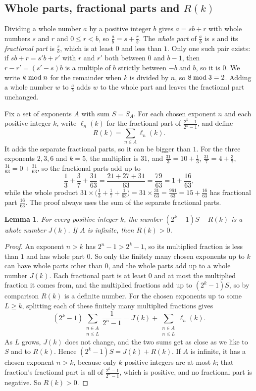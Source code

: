 \documentclass[10pt]{article}
\theoremstyle{plain}
\newtheorem{lemma}[theorem]{Lemma}
\theoremstyle{definition}
\theoremstyle{remark}
\newcommand{\lft}{\ell}
\newcommand{\rmod}{\mskip5mu\mathrm{mod}\mskip5mu}
\begin{document}
\subsection{Whole parts, fractional parts and \texorpdfstring{$R(k)$}{R(k)}}\label{app:split}

Dividing a whole number $a$ by a positive integer $b$ gives $a=sb+r$ with
whole numbers $s$ and $r$ and $0\le r<b$, so $\tfrac ab=s+\tfrac rb$. The
\emph{whole part} of $\tfrac ab$ is $s$ and its \emph{fractional part} is
$\tfrac rb$, which is at least $0$ and less than $1$. Only one such pair
exists: if $sb+r=s'b+r'$ with $r$ and $r'$ both between $0$ and $b-1$, then
$r-r'=(s'-s)b$ is a multiple of $b$ strictly between $-b$ and $b$, so it is
$0$. We write $k\rmod n$ for the remainder when $k$ is divided by $n$, so
$8\rmod3=2$. Adding a whole number $w$ to $\tfrac ab$ adds $w$ to the whole part
and leaves the fractional part unchanged.

Fix a set of exponents $A$ with sum $S=S_A$. For each chosen exponent $n$ and
each positive integer $k$, write $\lft_n(k)$ for the fractional part of
$\tfrac{2^k-1}{2^n-1}$, and define
\[
 R(k)=\sum_{n\in A}\lft_n(k).
\]
It adds the separate fractional parts, so it can be bigger than $1$. For the three
exponents $2,3,6$ and $k=5$, the multiplier is $31$, and
$\tfrac{31}3=10+\tfrac13$, $\tfrac{31}7=4+\tfrac37$,
$\tfrac{31}{63}=0+\tfrac{31}{63}$, so the fractional parts add up to
\[
 \frac13+\frac37+\frac{31}{63}=\frac{21+27+31}{63}=\frac{79}{63}=1+\frac{16}{63},
\]
while the whole product $31\times\bigl(\tfrac13+\tfrac17+\tfrac1{63}\bigr)=31\times\tfrac{31}{63}=\tfrac{961}{63}=15+\tfrac{16}{63}$
has fractional part $\tfrac{16}{63}$. The proof always uses the sum of the separate
fractional parts.

\begin{lemma}\label{lem:split}
For every positive integer $k$, the number $(2^k-1)S-R(k)$ is a whole number
$J(k)$. If $A$ is infinite, then $R(k)>0$.
\end{lemma}

\begin{proof}
An exponent $n>k$ has $2^n-1>2^k-1$, so its multiplied fraction is less than
$1$ and has whole part $0$. So only the finitely many chosen exponents up to
$k$ can have whole parts other than $0$, and the whole parts add up to a whole
number $J(k)$. Each fractional part
is at least $0$ and at most the multiplied fraction it comes from, and the
multiplied fractions add up to $(2^k-1)S$, so by comparison $R(k)$ is a definite
number. For the chosen exponents up to some $L\ge k$, splitting each of these
finitely many multiplied fractions gives
\[
 (2^k-1)\sum_{\substack{n\in A\\n\le L}}\frac1{2^n-1}
 =J(k)+\sum_{\substack{n\in A\\n\le L}}\lft_n(k).
\]
As $L$ grows, $J(k)$ does not change, and the two sums get as close as we like
to $S$ and to $R(k)$. Hence $(2^k-1)S=J(k)+R(k)$. If $A$ is infinite, it has a
chosen exponent $n>k$, because only $k$ positive integers are at most $k$; that
fraction's fractional part is all of $\tfrac{2^k-1}{2^n-1}$, which is positive, and
no fractional part is negative. So $R(k)>0$.
\end{proof}
\end{document}
